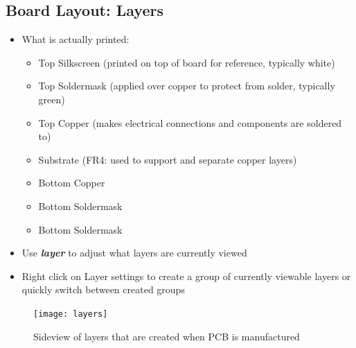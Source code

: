 \documentclass{article}
\begin{document}
\subsection{Board Layout: Layers}
\begin{itemize}
    \item What is actually printed:
    \begin{itemize}
        \item Top Silkscreen (printed on top of board for reference, typically white)
        \item Top Soldermask (applied over copper to protect from solder, typically green)
        \item Top Copper (makes electrical connections and components are soldered to)
        \item Substrate (FR4: used to support and separate copper layers)
        \item Bottom Copper
        \item Bottom Soldermask
        \item Bottom Soldermask
    \end{itemize}
    \item Use \textit{\textbf{layer}} to adjust what layers are currently viewed
\end{itemize}
\begin{tcolorbox} [title=Tips \& Tricks]
    \begin{itemize}
        \item Right click on Layer settings to create a group of currently viewable layers or quickly switch between created groups
    \end{itemize}
\end{tcolorbox}

\begin{figure}[!h]
    \center
    \texttt{[image: layers]}
    \caption {Sideview of layers that are created when PCB is manufactured}
    \label{img:layers}
\end{figure}
\end{document}
